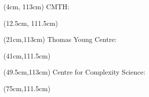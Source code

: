 \documentclass[xcolor={table}]{beamer}
\begin{document}
\begin{frame}[fragile=singleslide,t]
\begin{textblock*}{8cm}(4cm, 113cm) %
\Large \color{ICOrange}
CMTH:
\end{textblock*}

\begin{textblock*}{5cm}(12.5cm, 111.5cm) %
\color{black}
\end{textblock*}

\begin{textblock*}{20cm}(21cm,113cm) %
\Large \color{ICOrange}
Thomas Young Centre:
\end{textblock*}

\begin{textblock*}{5cm}(41cm,111.5cm) %
\color{black}
\end{textblock*}

\begin{textblock*}{25cm}(49.5cm,113cm) %
\Large \color{ICOrange}
Centre for Complexity Science:
\end{textblock*}

\begin{textblock*}{5cm}(75cm,111.5cm) %
\color{black}
\end{textblock*}




\end{frame}
\end{document}
